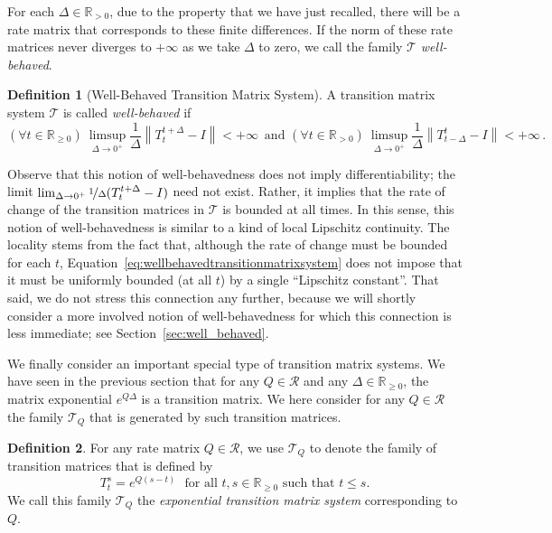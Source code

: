 \documentclass[10pt,a4paper]{paper}
\theoremstyle{definition}
\newtheorem{definition}{Definition}
\newcommand{\reals}{\mathbb{R}}
\newcommand{\realspos}{\reals_{>0}}
\newcommand{\realsnonneg}{\reals_{\geq 0}}
\newcommand{\norm}[1]{\left\lVert #1 \right\rVert}
\begin{document}
For each $\Delta\in\realspos$, due to the property that we have just recalled, there will be a rate matrix that corresponds to these finite differences. If the norm of these rate matrices never diverges to $+\infty$ as we take $\Delta$ to zero, we call the family $\mathcal{T}$ \emph{well-behaved}.

\begin{definition}[Well-Behaved Transition Matrix System]\label{def:well_behaved_trans_mat_system}
A transition matrix system $\mathcal{T}$ is called \emph{well-behaved} if 
\begin{equation}\label{eq:wellbehavedtransitionmatrixsystem}%
(\forall t\in\realsnonneg)~\limsup_{\Delta\to 0^{+}}\frac{1}{\Delta}\norm{T_{t}^{t+\Delta}-I}<+\infty\,
\text{~and~}
(\forall t\in\realspos)~\limsup_{\Delta\to 0^{+}}\frac{1}{\Delta}\norm{T_{t-\Delta}^t-I}<+\infty\,.
\end{equation}
\end{definition}

Observe that this notion of well-behavedness does not imply differentiability; the limit $\lim_{\Delta\to0^+}\nicefrac{1}{\Delta}(T_t^{t+\Delta}-I)$ need not exist. Rather, it implies that the rate of change of the transition matrices in $\mathcal{T}$ is bounded at all times. In this sense, this notion of well-behavedness is similar to a kind of local Lipschitz continuity. The locality stems from the fact that, although the rate of change must be bounded for each $t$, Equation~\eqref{eq:wellbehavedtransitionmatrixsystem} does not impose that it must be uniformly bounded (at all $t$) by a single ``Lipschitz constant''. That said, we do not stress this connection any further, because we will shortly consider a more involved notion of well-behavedness for which this connection is less immediate; see Section~\ref{sec:well_behaved}.

We finally consider an important special type of transition matrix systems. We have seen in the previous section that for any $Q\in\mathcal{R}$ and any $\Delta\in\realsnonneg$, the matrix exponential $e^{Q\Delta}$ is a transition matrix. We here consider for any $Q\in\mathcal{R}$ the family $\mathcal{T}_Q$ that is generated by such transition matrices.
\begin{definition}\label{def:systemfromQ}For any rate matrix $Q\in\mathcal{R}$, we use $\mathcal{T}_Q$ to denote the family of transition matrices that is defined by
\begin{equation*}
T_t^s=e^{Q(s-t)}
\text{~~for all $t,s\in\realsnonneg$ such that $t\leq s$.}
\end{equation*}
We call this family $\mathcal{T}_Q$ the \emph{exponential transition matrix system} corresponding to $Q$.
\end{definition}
\end{document}
